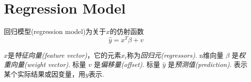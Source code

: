 \section{Regression Model}
\begin{definition}
    回归模型(regression model)为关于$x$的仿射函数
    $$ \hat{y}=x^{T} \beta+v $$

    $x$是\textit{特征向量(feature vector)}，它的元素$x_i$称为\textit{回归元(regressors)}. n维向量 $ \beta $ 是\textit{权重向量(weight vector)}. 标量 $ v $ 是\textit{偏移量(offset)}. 标量 $ \hat{y} $ 是\textit{预测值(prediction)}. 表示某个实际结果或因变量，用$y$表示. 
\end{definition}